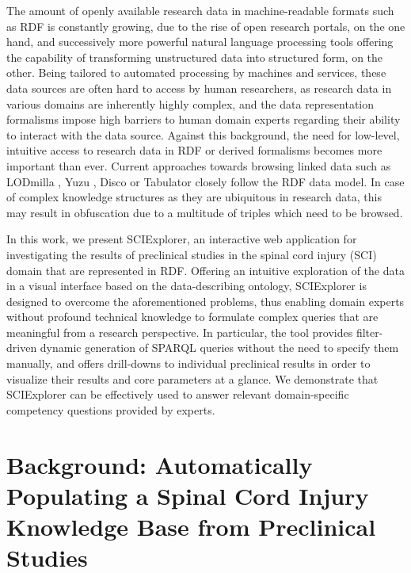 \documentclass[runningheads,a4paper]{llncs}
\begin{document}
The amount of openly available research data in machine-readable formats such as RDF is constantly growing, due to the rise of open research portals, on the one hand, and successively more powerful natural language processing tools offering the capability of transforming unstructured data into structured form, on the other. Being tailored to automated processing by machines and services, these data sources are often hard to access by human researchers, as research data in various domains are inherently highly complex, and the data representation formalisms impose high barriers to human domain experts regarding their ability to interact with the data source. Against this background, the need for low-level, intuitive access to research data in RDF or derived formalisms becomes more important than ever. Current approaches towards browsing linked data such as LODmilla  \cite{__RefNumPara__9808_1959585331}, Yuzu  \cite{__RefNumPara__9846_1959585331}, Disco  \cite{__RefNumPara__9848_1959585331} or Tabulator  \cite{__RefNumPara__9850_1959585331} closely follow the RDF data model. In case of complex knowledge structures as they are ubiquitous in research data, this may result in obfuscation due to a multitude of triples which need to be browsed.

In this work, we present SCIExplorer, an interactive web application for investigating the results of preclinical studies in the spinal cord injury (SCI) domain that are represented in RDF. Offering an intuitive exploration of the data in a visual interface based on the data-describing ontology, SCIExplorer is designed to overcome the aforementioned problems, thus enabling domain experts without profound technical knowledge to formulate complex queries that are meaningful from a research perspective. In particular, the tool provides filter-driven dynamic generation of SPARQL queries without the need to specify them manually, and offers drill-downs to individual preclinical results in order to visualize their results and core parameters at a glance. We demonstrate that SCIExplorer can be effectively used to answer relevant domain-specific competency questions provided by experts.

\section{Background: Automatically Populating a Spinal Cord Injury Knowledge Base from Preclinical Studies}
\end{document}
